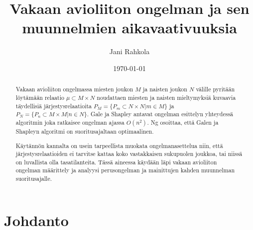 \documentclass[gradu, twoside]{tktltiki}
\begin{document}
\title{Vakaan avioliiton ongelman ja sen muunnelmien aikavaativuuksia}
\author{Jani Rahkola}
\date{\today}



\maketitle

\doublespacing

\subject{Tietojenkäsittelytiede}

\begin{abstract}
  Vakaan avioliiton ongelmassa miesten joukon $M$ ja naisten joukon
  $N$ välille pyritään löytämään relaatio $\mu \subset M \times N$
  noudattaen miesten ja naisten mieltymyksiä kuvaavia täydellisiä
  järjestysrelaatioita $P_M = \{P_m \subset N \times N | m \in M\}$ ja
  $P_N = \{P_n \subset M \times M | n \in N\}$. Gale ja Shapley
  antavat ongelman esittelyn yhteydessä algoritmin joka ratkaisee
  ongelman ajassa $O(n^2)$. Ng osoittaa, että Galen ja Shapleyn
  algoritmi on suoritusajaltaan optimaalinen.

  Käytännön kannalta on usein tarpeellista muokata ongelmanasettelua
  niin, että järjestysrelaatioiden ei tarvitse kattaa koko vastakkaisen
  sukupuolen joukkoa, tai niissä on luvallista olla tasatilanteita.
  Tässä aineessa käydään läpi vakaan avioliiton ongelman määrittely ja
  analyysi perusongelman ja mainittujen kahden muunnelman suoritusajalle.
\end{abstract}

\mytableofcontents

\section{Johdanto}
\end{document}
